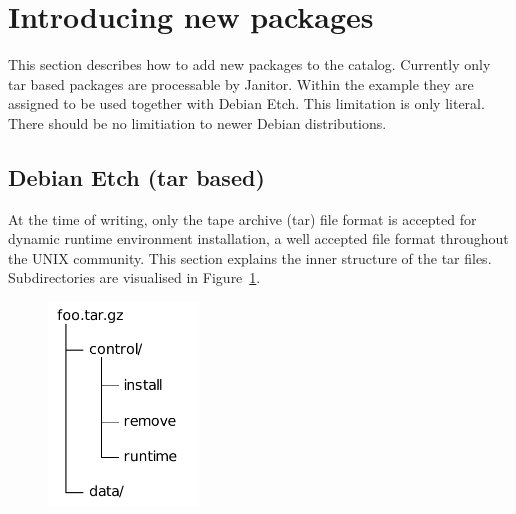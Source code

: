 \section{Introducing new packages}\label{sec:introducing_new_packages}

This section describes how to add new packages to the catalog. Currently only tar based packages are processable by Janitor.
Within the example they are assigned to be used together with Debian Etch. This limitation is only literal. 
There should be no limitiation
to newer Debian distributions.

\subsection{Debian Etch (tar based)}

At the time of writing, only the tape archive (tar) file format is accepted for dynamic runtime environment installation, 
a well accepted file format throughout the UNIX community. This section explains the inner structure of the tar files. 
Subdirectories are visualised in Figure~\ref{fig:tar_folder}.

\begin{figure}
  \begin{center}
    \includegraphics[width=4cm]{images/tar_folder.pdf}
    \label{fig:tar_folder}
  \end{center}
\end{figure}

